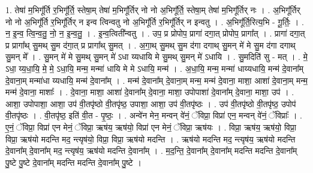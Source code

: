 \documentclass[17pt]{extarticle}
\begin{document}
1. तेषा॑ म॒भिगू᳚र्ति र॒भिगू᳚र्ति॒ स्तेषा॒म् तेषा॑ म॒भिगू᳚र्तिर् नो नो अ॒भिगू᳚र्ति॒ स्तेषा॒म् तेषा॑ म॒भिगू᳚र्तिर् नः । . अ॒भिगू᳚र्तिर् नो नो अ॒भिगू᳚र्ति र॒भिगू᳚र्तिर् न इन्व त्विन्वतु नो अ॒भिगू᳚र्ति र॒भिगू᳚र्तिर् न इन्वतु । . अ॒भिगू᳚र्ति॒रित्य॒भि - गू॒र्तिः॒ । . न॒ इ॒न्व॒ त्वि॒न्व॒तु॒ नो॒ न॒ इ॒न्व॒तु॒ । . इ॒न्व॒त्विती᳚न्वतु । . उप॒ प्र प्रोपोप॒ प्रागा॑ दगा॒त् प्रोपोप॒ प्रागा᳚त् । . प्रागा॑ दगा॒त् प्र प्रागा᳚थ् सु॒मथ् सु॒म द॑गा॒त् प्र प्रागा᳚थ् सु॒मत् । . अ॒गा॒थ् सु॒मथ् सु॒म द॑गा दगाथ् सु॒मन् मे॑ मे सु॒म द॑गा दगाथ् सु॒मन् मे᳚ । . सु॒मन् मे॑ मे सु॒मथ् सु॒मन् मे॑ ऽधा य्यधायि मे सु॒मथ् सु॒मन् मे॑ ऽधायि । . सु॒मदिति॑ सु - मत् । . मे॒ ऽधा॒ य्य॒धा॒यि॒ मे॒ मे॒ ऽधा॒यि॒ मन्म॒ मन्मा॑ धायि मे मे ऽधायि॒ मन्म॑ । . अ॒धा॒यि॒ मन्म॒ मन्मा॑ धाय्यधायि॒ मन्म॑ दे॒वाना᳚म् दे॒वाना॒म् मन्मा॑धा य्यधायि॒ मन्म॑ दे॒वाना᳚म् । . मन्म॑ दे॒वाना᳚म् दे॒वाना॒म् मन्म॒ मन्म॑ दे॒वाना॒ माशा॒ आशा॑ दे॒वाना॒म् मन्म॒ मन्म॑ दे॒वाना॒ माशाः᳚ । . दे॒वाना॒ माशा॒ आशा॑ दे॒वाना᳚म् दे॒वाना॒ माशा॒ उपोपाशा॑ दे॒वाना᳚म् दे॒वाना॒ माशा॒ उप॑ । . आशा॒ उपोपाशा॒ आशा॒ उप॑ वी॒तपृ॑ष्ठो वी॒तपृ॑ष्ठ॒ उपाशा॒ आशा॒ उप॑ वी॒तपृ॑ष्ठः । . उप॑ वी॒तपृ॑ष्ठो वी॒तपृ॑ष्ठ॒ उपोप॑ वी॒तपृ॑ष्ठः । . वी॒तपृ॑ष्ठ॒ इति॑ वी॒त - पृ॒ष्ठः॒ । . अन्वे॑न मेन॒ मन्वन् वे॑नं॒ ॅविप्रा॒ विप्रा॑ एन॒ मन्वन् वे॑नं॒ ॅविप्राः᳚ । . ए॒नं॒ ॅविप्रा॒ विप्रा॑ एन मेनं॒ ॅविप्रा॒ ऋष॑य॒ ऋष॑यो॒ विप्रा॑ एन मेनं॒ ॅविप्रा॒ ऋष॑यः । . विप्रा॒ ऋष॑य॒ ऋष॑यो॒ विप्रा॒ विप्रा॒ ऋष॑यो मदन्ति मद॒ न्त्यृष॑यो॒ विप्रा॒ विप्रा॒ ऋष॑यो मदन्ति । . ऋष॑यो मदन्ति मद॒ न्त्यृष॑य॒ ऋष॑यो मदन्ति दे॒वाना᳚म् दे॒वाना᳚म् मद॒ न्त्यृष॑य॒ ऋष॑यो मदन्ति दे॒वाना᳚म् । . म॒द॒न्ति॒ दे॒वाना᳚म् दे॒वाना᳚म् मदन्ति मदन्ति दे॒वाना᳚म् पु॒ष्टे पु॒ष्टे दे॒वाना᳚म् मदन्ति मदन्ति दे॒वाना᳚म् पु॒ष्टे । \newline
\end{document}
